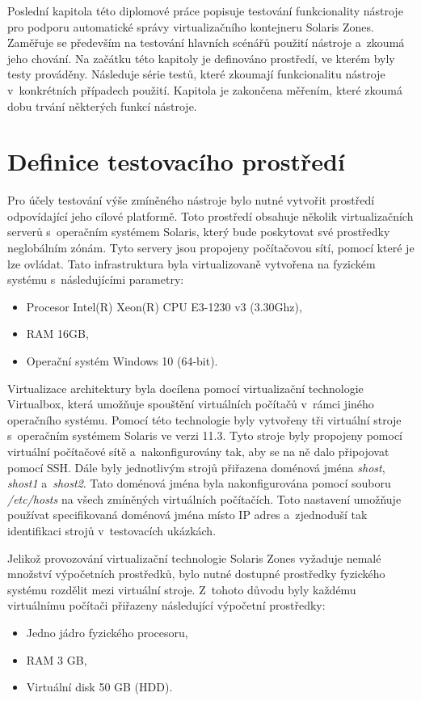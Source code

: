\label{chapter:testing}
Poslední kapitola této diplomové práce popisuje testování funkcionality nástroje pro podporu automatické správy virtualizačního
kontejneru Solaris Zones. Zaměřuje se především na testování
hlavních scénářů použití nástroje a~zkoumá jeho chování. Na začátku této kapitoly je definováno prostředí, ve kterém byly
testy prováděny. Následuje série testů, které zkoumají funkcionalitu nástroje v~konkrétních případech použití. Kapitola je zakončena
měřením, které zkoumá dobu trvání některých funkcí nástroje.
\section{Definice testovacího prostředí}
\label{chapter:testing:environment}
Pro účely testování výše zmíněného nástroje bylo nutné vytvořit prostředí odpovídající jeho cílové platformě. Toto prostředí
obsahuje několik virtualizačních serverů s~operačním systémem Solaris, který bude poskytovat své prostředky neglobálním zónám.
Tyto servery jsou propojeny počítačovou sítí, pomocí které je lze ovládat. Tato infrastruktura byla virtualizovaně vytvořena na 
fyzickém systému s~následujícími parametry:
\begin{itemize}
 \item Procesor Intel(R) Xeon(R) CPU E3-1230 v3 (3.30Ghz),
 \item RAM 16GB,
 \item Operační systém Windows 10 (64-bit).
\end{itemize}
Virtualizace architektury byla docílena pomocí virtualizační technologie Virtualbox, která umožňuje spouštění virtuálních 
počítačů v~rámci jiného operačního systému. Pomocí této technologie byly vytvořeny tři virtuální stroje s~operačním systémem
Solaris ve verzi 11.3. Tyto stroje byly propojeny pomocí virtuální počítačové sítě a~nakonfigurovány tak, aby se na ně dalo 
připojovat pomocí SSH. Dále byly jednotlivým strojů přiřazena doménová jména \textit{shost}, \textit{shost1} a~\textit{shost2}.
Tato doménová jména byla nakonfigurována pomocí souboru \textit{/etc/hosts} na všech zmíněných virtuálních počítačích. Toto
nastavení umožňuje používat specifikovaná doménová jména místo IP adres a~zjednoduší tak identifikaci strojů v~testovacích
ukázkách. 

Jelikož provozování virtualizační technologie Solaris Zones vyžaduje nemalé množství výpočetních prostředků, bylo nutné
dostupné prostředky fyzického systému rozdělit mezi virtuální stroje. Z~tohoto důvodu byly každému virtuálnímu počítači
přiřazeny následující výpočetní prostředky:
\begin{itemize}
 \item Jedno jádro fyzického procesoru,
 \item RAM 3 GB,
 \item Virtuální disk 50 GB (HDD).
\end{itemize}

